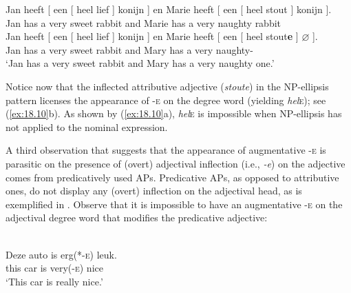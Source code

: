 \documentclass[output=paper]{langsci/langscibook}
\begin{document}
\ea%
    \label{ex:18.9}
	\ea
	\gll Jan   heeft  [ een  [ heel  lief ] konijn ] en  Marie  heeft  [ een  [ heel  stout ]      konijn ].\\
    Jan    has    {}  a  {}  very    sweet {} rabbit {} and  Marie  has  {} a  {}  very    naughty {}    rabbit\\
	\glt
	\ex
	\gll Jan    heeft  [ een  [ heel  lief ]      konijn ] en  Marie  heeft  [ een  [ heel    stout\textbf{e} ] $\varnothing$ ].\\
    Jan    has  {}  a    {}  very    sweet {} rabbit  {}  and  Mary  has    {}
    a   {}   very    naughty-\Agr{}\\
	\glt \enquote*{Jan has a very sweet rabbit and Mary has a very naughty one.}
	\z
\z\largerpage[1]

Notice now that the inflected attributive adjective (\emph{stoute}) in the
NP-ellipsis pattern licenses the appearance of \textsc{-e} on the degree word
(yielding \emph{hel}\textsc{e}); see (\ref{ex:18.10}b). As shown by
(\ref{ex:18.10}a), \emph{hel}\textsc{e} is impossible when NP-ellipsis has not
applied to the nominal expression.

\ea%
\label{ex:18.10}
	\z
\z

A third observation that suggests that the appearance of augmentative
\textsc{-e} is parasitic on the presence of (overt) adjectival inflection
(i.e., \emph{-e}) on the adjective comes from predicatively used APs.
Predicative APs, as opposed to attributive ones, do not display any (overt)
inflection on the adjectival head, as is exemplified in .
Observe that it is impossible to have an augmentative \textsc{-e} on the
adjectival degree word that modifies the predicative adjective:

\ea%
\label{ex:18.11}\\
    \gll Deze    auto    is  erg(*-\textsc{e})    leuk.\\
        this      car      is  very(\textsc{-e})  nice\\
    \glt \enquote*{This car is really nice.}
\z
\end{document}
